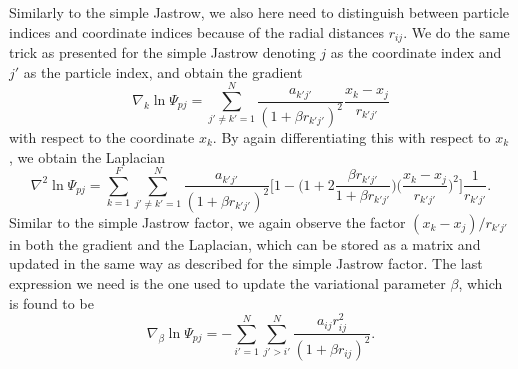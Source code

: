 Similarly to the simple Jastrow, we also here need to distinguish between particle indices and coordinate indices because of the radial distances $r_{ij}$. We do the same trick as presented for the simple Jastrow denoting $j$ as the coordinate index and $j'$ as the particle index, and obtain the gradient 
\begin{equation}
\nabla_k\ln\Psi_{pj}=\sum_{j'\neq k'=1}^N\frac{a_{k'j'}}{(1+\beta r_{k'j'})^2}\frac{x_k-x_j}{r_{k'j'}}
\end{equation}
with respect to the coordinate $x_k$. By again differentiating this with respect to $x_k$, we obtain the Laplacian
\begin{equation}
\nabla^2\ln\Psi_{pj}=\sum_{k=1}^{F}\sum_{j'\neq k'=1}^N\frac{a_{k'j'}}{(1+\beta r_{k'j'})^2}\bigg[1-\Big(1+2\frac{\beta r_{k'j'}}{1+\beta r_{k'j'}}\Big)\Big(\frac{x_k-x_j}{r_{k'j'}}\Big)^2\bigg]\frac{1}{r_{k'j'}}.
\end{equation}
Similar to the simple Jastrow factor, we again observe the factor $(x_k-x_j)/r_{k'j'}$ in both the gradient and the Laplacian, which can be stored as a matrix and updated in the same way as described for the simple Jastrow factor. The last expression we need  is the one used to update the variational parameter $\beta$, which is found to be
\begin{equation}
\nabla_{\beta}\ln\Psi_{pj}=-\sum_{i'=1}^N\sum_{j'>i'}^N\frac{a_{ij}r_{ij}^2}{(1+\beta r_{ij})^2}.
\end{equation}

